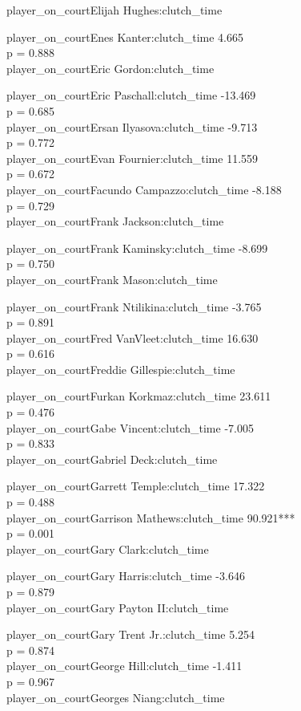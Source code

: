 \documentclass[
  landscape]{article}
\begin{document}
player\_on\_courtElijah Hughes:clutch\_time

player\_on\_courtEnes Kanter:clutch\_time 4.665\\
p = 0.888\\
player\_on\_courtEric Gordon:clutch\_time

player\_on\_courtEric Paschall:clutch\_time -13.469\\
p = 0.685\\
player\_on\_courtErsan Ilyasova:clutch\_time -9.713\\
p = 0.772\\
player\_on\_courtEvan Fournier:clutch\_time 11.559\\
p = 0.672\\
player\_on\_courtFacundo Campazzo:clutch\_time -8.188\\
p = 0.729\\
player\_on\_courtFrank Jackson:clutch\_time

player\_on\_courtFrank Kaminsky:clutch\_time -8.699\\
p = 0.750\\
player\_on\_courtFrank Mason:clutch\_time

player\_on\_courtFrank Ntilikina:clutch\_time -3.765\\
p = 0.891\\
player\_on\_courtFred VanVleet:clutch\_time 16.630\\
p = 0.616\\
player\_on\_courtFreddie Gillespie:clutch\_time

player\_on\_courtFurkan Korkmaz:clutch\_time 23.611\\
p = 0.476\\
player\_on\_courtGabe Vincent:clutch\_time -7.005\\
p = 0.833\\
player\_on\_courtGabriel Deck:clutch\_time

player\_on\_courtGarrett Temple:clutch\_time 17.322\\
p = 0.488\\
player\_on\_courtGarrison Mathews:clutch\_time 90.921***\\
p = 0.001\\
player\_on\_courtGary Clark:clutch\_time

player\_on\_courtGary Harris:clutch\_time -3.646\\
p = 0.879\\
player\_on\_courtGary Payton II:clutch\_time

player\_on\_courtGary Trent Jr.:clutch\_time 5.254\\
p = 0.874\\
player\_on\_courtGeorge Hill:clutch\_time -1.411\\
p = 0.967\\
player\_on\_courtGeorges Niang:clutch\_time
\end{document}
